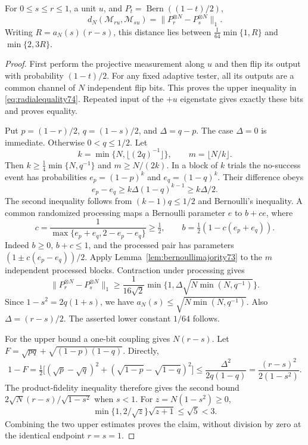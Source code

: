 \begin{lemma}\label{lem:radial74}
For $0\le s\le r\le1$, a unit $u$, and $P_t=\operatorname{Bern}((1-t)/2)$,
\begin{equation}\label{eq:radialequality74}
 d_N(\mathcal M_{ru},\mathcal M_{su})
       =\|P_r^{\otimes N}-P_s^{\otimes N}\|_1.
\end{equation}
Writing $R=a_N(s)(r-s)$, this distance lies between
$\frac1{64}\min\{1,R\}$ and $\min\{2,3R\}$.
\end{lemma}
\begin{proof}
First perform the projective measurement along $u$ and then flip its
output with probability $(1-t)/2$. For any fixed adaptive tester, all
its outputs are a common channel of $N$ independent flip bits. This
proves the upper inequality in \eqref{eq:radialequality74}. Repeated
input of the $+u$ eigenstate gives exactly these bits and proves equality.

Put $p=(1-r)/2$, $q=(1-s)/2$, and $\Delta=q-p$. The case $\Delta=0$
is immediate. Otherwise $0<q\le1/2$. Let
\[
 k=\min\{N,\lfloor(2q)^{-1}\rfloor\},\qquad m=\lfloor N/k\rfloor.
\]
Then $k\ge\frac14\min\{N,q^{-1}\}$ and $m\ge N/(2k)$.
In a block of $k$ trials the no-success event has probabilities
$e_p=(1-p)^k$ and $e_q=(1-q)^k$. Their difference obeys
\[
 e_p-e_q\ge k\Delta(1-q)^{k-1}\ge k\Delta/2.
\]
The second inequality follows from $(k-1)q\le1/2$ and Bernoulli's
inequality. A common randomized processing maps a Bernoulli parameter
$e$ to $b+ce$, where
\[
 c=\frac1{\max\{e_p+e_q,2-e_p-e_q\}}\ge\tfrac12,
 \qquad b=\tfrac12(1-c(e_p+e_q)).
\]
Indeed $b\ge0$, $b+c\le1$, and the processed pair has parameters
$(1\pm c(e_p-e_q))/2$. Apply
Lemma~\ref{lem:bernoullimajority73} to the $m$ independent processed
blocks. Contraction under processing gives
\[
 \|P_r^{\otimes N}-P_s^{\otimes N}\|_1
 \ge\frac1{16\sqrt2}\min\{1,\Delta\sqrt{N\min(N,q^{-1})}\}.
\]
Since $1-s^2=2q(1+s)$, we have
$a_N(s)\le\sqrt{N\min(N,q^{-1})}$. Also $\Delta=(r-s)/2$.
The asserted lower constant $1/64$ follows.

For the upper bound a one-bit coupling gives $N(r-s)$. Let
$F=\sqrt{pq}+\sqrt{(1-p)(1-q)}$. Directly,
\[
 1-F=\tfrac12\bigl[(\sqrt p-\sqrt q)^2+
                 (\sqrt{1-p}-\sqrt{1-q})^2\bigr]
 \le\frac{\Delta^2}{2q(1-q)}
 =\frac{(r-s)^2}{2(1-s^2)}.
\]
The product-fidelity inequality therefore gives the second bound
$2\sqrt N(r-s)/\sqrt{1-s^2}$ when $s<1$. For $z=N(1-s^2)\ge0$,
\[
 \min\{1,2/\sqrt z\}\sqrt{z+1}\le\sqrt5<3.
\]
Combining the two upper estimates proves the claim, without division
by zero at the identical endpoint $r=s=1$.
\end{proof}

